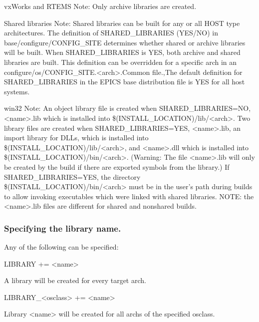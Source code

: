 vxWorks and RTEMS Note: Only archive libraries are created.

Shared libraries Note: Shared libraries can be built for any or all HOST type architectures. The definition of 
SHARED\_LIBRARIES (YES/NO) in base/configure/CONFIG\_SITE determines whether shared or archive libraries will 
be built. When SHARED\_LIBRARIES is YES, both archive and shared libraries are built. This definition can be 
overridden for a specific arch in an configure/os/CONFIG\_SITE.\textless{}arch\textgreater{}.Common file.,The default definition for 
SHARED\_LIBRARIES in the EPICS base distribution file is YES for all host systems.

win32 Note: An object library file is created when SHARED\_LIBRARIES=NO, \textless{}name\textgreater{}.lib which is installed into 
\$(INSTALL\_LOCATION)/lib/\textless{}arch\textgreater{}. Two library files are created when SHARED\_LIBRARIES=YES, \textless{}name\textgreater{}.lib, an 
import library for DLLs, which is installed into \$(INSTALL\_LOCATION)/lib/\textless{}arch\textgreater{}, and \textless{}name\textgreater{}.dll which is installed 
into \$(INSTALL\_LOCATION)/bin/\textless{}arch\textgreater{}. (Warning: The file \textless{}name\textgreater{}.lib will only be created by the build if there are 
exported symbols from the library.) If SHARED\_LIBRARIES=YES, the directory \$(INSTALL\_LOCATION)/bin/\textless{}arch\textgreater{} 
must be in the user's path during builds to allow invoking executables which were linked with shared libraries. NOTE: the 
\textless{}name\textgreater{}.lib files are different for shared and nonshared builds.

\subsubsection{Specifying the library name.}

Any of the following can be specified:

\begin{description}\item {}LIBRARY += \textless{}name\textgreater{}

\end{description}A library will be created for every target arch.

\begin{description}\item LIBRARY\_\textless{}osclass\textgreater{} += \textless{}name\textgreater{}

\end{description}Library \textless{}name\textgreater{} will be created for all archs of the specified osclass.

